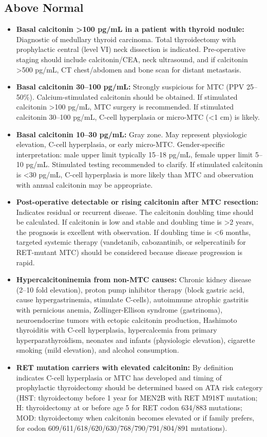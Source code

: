 \subsection*{Above Normal}
\begin{itemize}
  \item \textbf{Basal calcitonin >100 pg/mL in a patient with thyroid nodule:} Diagnostic of medullary thyroid carcinoma. Total thyroidectomy with prophylactic central (level VI) neck dissection is indicated. Pre-operative staging should include calcitonin/CEA, neck ultrasound, and if calcitonin >500 pg/mL, CT chest/abdomen and bone scan for distant metastasis.
  \item \textbf{Basal calcitonin 30--100 pg/mL:} Strongly suspicious for MTC (PPV 25--50\%). Calcium-stimulated calcitonin should be obtained. If stimulated calcitonin >100 pg/mL, MTC surgery is recommended. If stimulated calcitonin 30--100 pg/mL, C-cell hyperplasia or micro-MTC (<1 cm) is likely.
  \item \textbf{Basal calcitonin 10--30 pg/mL:} Gray zone. May represent physiologic elevation, C-cell hyperplasia, or early micro-MTC. Gender-specific interpretation: male upper limit typically 15--18 pg/mL, female upper limit 5--10 pg/mL. Stimulated testing recommended to clarify. If stimulated calcitonin is <30 pg/mL, C-cell hyperplasia is more likely than MTC and observation with annual calcitonin may be appropriate.
  \item \textbf{Post-operative detectable or rising calcitonin after MTC resection:} Indicates residual or recurrent disease. The calcitonin doubling time should be calculated. If calcitonin is low and stable and doubling time is >2 years, the prognosis is excellent with observation. If doubling time is <6 months, targeted systemic therapy (vandetanib, cabozantinib, or selpercatinib for RET-mutant MTC) should be considered because disease progression is rapid.
  \item \textbf{Hypercalcitoninemia from non-MTC causes:} Chronic kidney disease (2--10 fold elevation), proton pump inhibitor therapy (block gastric acid, cause hypergastrinemia, stimulate C-cells), autoimmune atrophic gastritis with pernicious anemia, Zollinger-Ellison syndrome (gastrinoma), neuroendocrine tumors with ectopic calcitonin production, Hashimoto thyroiditis with C-cell hyperplasia, hypercalcemia from primary hyperparathyroidism, neonates and infants (physiologic elevation), cigarette smoking (mild elevation), and alcohol consumption.
  \item \textbf{RET mutation carriers with elevated calcitonin:} By definition indicates C-cell hyperplasia or MTC has developed and timing of prophylactic thyroidectomy should be determined based on ATA risk category (HST: thyroidectomy before 1 year for MEN2B with RET M918T mutation; H: thyroidectomy at or before age 5 for RET codon 634/883 mutations; MOD: thyroidectomy when calcitonin becomes elevated or if family prefers, for codon 609/611/618/620/630/768/790/791/804/891 mutations).
\end{itemize}

